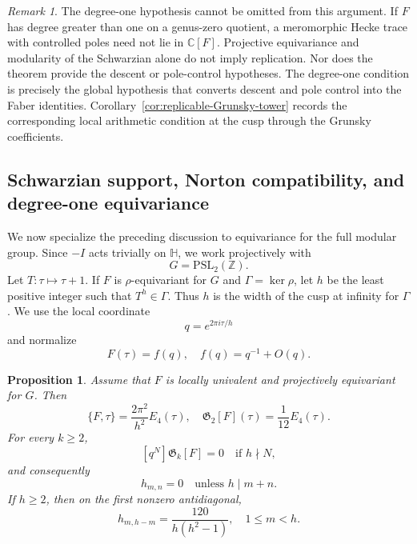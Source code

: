 \documentclass[11pt]{amsart}
\newtheorem{prop}[thm]{Proposition}
\theoremstyle{definition}
\theoremstyle{remark}
\newtheorem{remark}[thm]{Remark}
\numberwithin{equation}{section}
\begin{document}
\begin{remark}\label{rem:degree-one-essential}
The degree-one hypothesis cannot be omitted from this argument. If $F$ has degree greater than one on a genus-zero quotient, a meromorphic Hecke trace with controlled poles need not lie in $\mathbb C[F]$. Projective equivariance and modularity of the Schwarzian alone do not imply replication. Nor does the theorem provide the descent or pole-control hypotheses. The degree-one condition is precisely the global hypothesis that converts descent and pole control into the Faber identities. Corollary~\ref{cor:replicable-Grunsky-tower} records the corresponding local arithmetic condition at the cusp through the Grunsky coefficients.
\end{remark}


\subsection{Schwarzian support, Norton compatibility, and degree-one equivariance}
We now specialize the preceding discussion to equivariance for the full modular group.  Since $-I$ acts trivially on $\mathbb H$, we work projectively with
\[
G=\mathrm{PSL}_2(\mathbb Z).
\]
Let $T:\tau\mapsto\tau+1$.  If $F$ is $\rho$-equivariant for $G$ and $\Gamma=\ker\rho$, let $h$ be the least positive integer such that $T^h\in\Gamma$.  Thus $h$ is the width of the cusp at infinity for $\Gamma$.  We use the local coordinate
\[
q=e^{2\pi i\tau/h}
\]
and normalize
\[
F(\tau)=f(q),\quad f(q)=q^{-1}+O(q).
\]

\begin{prop}\label{prop:full-modular-support}
Assume that $F$ is locally univalent and projectively equivariant for $G$.  Then
\begin{equation}\label{eq:full-modular-Schwarzian}
\{F,\tau\}=\frac{2\pi^2}{h^2}E_4(\tau),
\quad
\mathfrak G_2[F](\tau)=\frac1{12}E_4(\tau).
\end{equation}
For every $k\geq2$,
\begin{equation}\label{eq:moment-support-h}
[q^N]\mathfrak G_k[F]=0
\quad\text{if }h\nmid N,
\end{equation}
and consequently
\begin{equation}\label{eq:Grunsky-support-h}
h_{m,n}=0
\quad\text{unless }h\mid m+n.
\end{equation}
If $h\geq2$, then on the first nonzero antidiagonal,
\begin{equation}\label{eq:first-Grunsky-antidiagonal}
h_{m,h-m}
=
\frac{120}{h(h^2-1)},
\quad 1\leq m<h.
\end{equation}
\end{prop}
\end{document}
